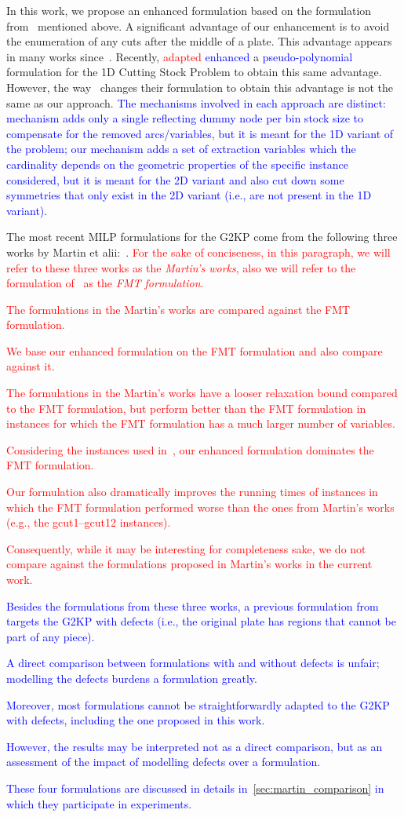 \documentclass[ppgc,tese,english,formais,babel]{iiufrgs}
\newif\iffinalversion
\newcommand{\newtext}[1]{\iffinalversion%
#1%
\else%
\textcolor{blue}{#1}%
\fi%
}
\newcommand{\oldtext}[1]{\iffinalversion%
\else%
\textcolor{red}{#1}%
\fi%
}
\begin{document}
In this work, we propose an enhanced formulation based on the formulation from~\citet{furini:2016} mentioned above.
A significant advantage of our enhancement is to avoid the enumeration of any cuts after the middle of a plate.
This advantage appears in many works since~\citet{herz:1972}.
Recently, \citet{delorme:2019} \oldtext{adapted}\newtext{enhanced} a \newtext{pseudo-polynomial} formulation for the 1D Cutting Stock Problem to obtain this same advantage.
However, the way \citet{delorme:2019}~changes their formulation to obtain this advantage is not the same as our approach.
\newtext{The mechanisms involved in each approach are distinct: \citet{delorme:2019} mechanism adds only a single reflecting dummy node per bin stock size to compensate for the removed arcs/variables, but it is meant for the 1D variant of the problem; our mechanism adds a set of extraction variables which the cardinality depends on the geometric properties of the specific instance considered, but it is meant for the 2D variant and also cut down some symmetries that only exist in the 2D variant (i.e., are not present in the 1D variant).}

The most recent MILP formulations for the G2KP come from the following three works by Martin et alii:~\citet{martin:2020:models,martin:2020:bottom,martin:2020:top}.
\oldtext{For the sake of conciseness, in this paragraph, we will refer to these three works as the \emph{Martin's works}, also we will refer to the formulation of~\citet{furini:2016} as the \emph{FMT formulation}.}
\oldtext{The formulations in the Martin's works are compared against the FMT formulation.}
\oldtext{We base our enhanced formulation on the FMT formulation and also compare against it.}
\oldtext{The formulations in the Martin's works have a looser relaxation bound compared to the FMT formulation, but perform better than the FMT formulation in instances for which the FMT formulation has a much larger number of variables.}
\oldtext{Considering the instances used in~\citet{furini:2016}, our enhanced formulation dominates the FMT formulation.}
\oldtext{Our formulation also dramatically improves the running times of instances in which the FMT formulation performed worse than the ones from Martin's works (e.g., the gcut1--gcut12 instances).}
\oldtext{Consequently, while it may be interesting for completeness sake, we do not compare against the formulations proposed in Martin's works in the current work.}
\newtext{Besides the formulations from these three works, a previous formulation from \citet{martin:2019} targets the G2KP with defects (i.e., the original plate has regions that cannot be part of any piece).}
\newtext{A direct comparison between formulations with and without defects is unfair; modelling the defects burdens a formulation greatly.}
\newtext{Moreover, most formulations cannot be straightforwardly adapted to the G2KP with defects, including the one proposed in this work.}
\newtext{However, the results may be interpreted not as a direct comparison, but as an assessment of the impact of modelling defects over a formulation.}
\newtext{These four formulations are discussed in details in~\cref{sec:martin_comparison} in which they participate in experiments.}
\end{document}
